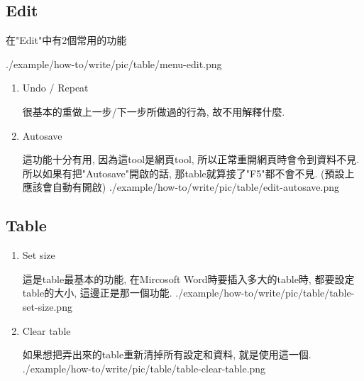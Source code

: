 \newpage
\subsection{Edit}

  在"Edit"中有2個常用的功能

  \InsertCenterImage
    {./example/how-to/write/pic/table/menu-edit.png}

  \begin{enumerate}

    \item
    {
      Undo / Repeat

      很基本的重做上一步/下一步所做過的行為, 故不用解釋什麼.
    } %

    \item
    {
      Autosave

      這功能十分有用, 因為這tool是網頁tool, 所以正常重開網頁時會令到資料不見. 所以如果有把"Autosave"開啟的話, 那table就算接了"F5"都不會不見. (預設上應該會自動有開啟)
      \InsertCenterImage
        {./example/how-to/write/pic/table/edit-autosave.png}
    } %

  \end{enumerate}

\newpage
\subsection{Table}

  \begin{enumerate}

    \item
    {
      Set size

      這是table最基本的功能, 在Mircosoft Word時要插入多大的table時, 都要設定table的大小, 這邊正是那一個功能.
      \InsertCenterImage
        {./example/how-to/write/pic/table/table-set-size.png}
    } %

    \item
    {
      Clear table

      如果想把弄出來的table重新清掉所有設定和資料, 就是使用這一個.
      \InsertCenterImage
        {./example/how-to/write/pic/table/table-clear-table.png}
    } %

  \end{enumerate}

